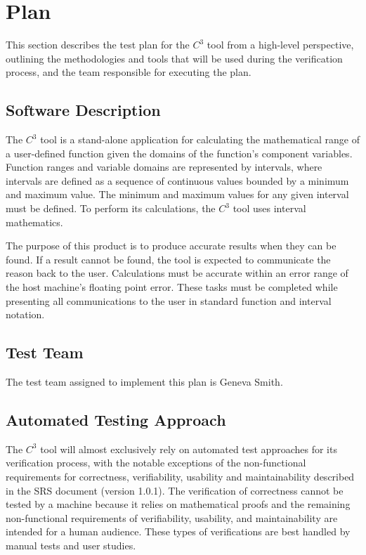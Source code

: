 \documentclass[12pt, titlepage]{article}
\newcommand{\prognameAbbrv}{$C^{3}$}
\newcommand{\srsVersion}{1.0.1}
\begin{document}
\section{Plan}
\label{testplan_highlevel}
This section describes the test plan for the \prognameAbbrv{} tool from a 
high-level perspective, outlining the methodologies and tools that will be used 
during the verification process, and the team responsible for executing the 
plan.
	
\subsection{Software Description}
The \prognameAbbrv{} tool is a stand-alone application for calculating 
the mathematical range of a user-defined function given the domains of the 
function's component variables. Function ranges and variable domains are 
represented by intervals, where intervals are defined as a sequence of 
continuous values bounded by a minimum and maximum value. The minimum and 
maximum values for any given interval must be defined. To perform its 
calculations, the \prognameAbbrv{} tool uses interval mathematics.

The purpose of this product is to produce accurate results when they can be 
found. If a result cannot be found, the tool is expected to communicate the 
reason back to the user. Calculations must be accurate within an error range of 
the host machine's floating point error. These tasks must be completed while 
presenting all communications to the user in standard function and interval 
notation.

\subsection{Test Team}

The test team assigned to implement this plan is Geneva Smith.

\subsection{Automated Testing Approach}
The \prognameAbbrv{} tool will almost exclusively rely on automated test 
approaches for its verification process, with the notable exceptions of the 
non-functional requirements for correctness, verifiability, usability and 
maintainability described in the SRS document (version \srsVersion{}). The 
verification of correctness cannot be tested by a machine because it relies on 
mathematical proofs and the remaining non-functional requirements of 
verifiability, usability, and maintainability are intended for a 
human audience. These types of verifications are best handled by manual tests 
and user studies.
\end{document}
